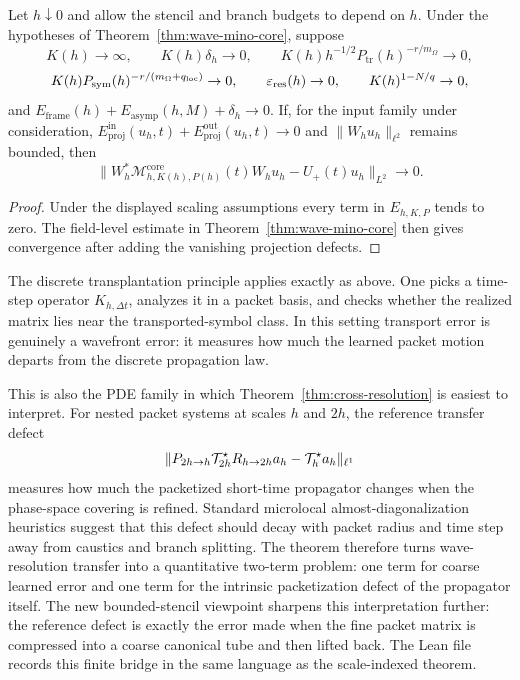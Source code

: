\begin{corollary}
\label{cor:rate-balancing}
Let $h\downarrow0$ and allow the stencil and branch budgets to depend on $h$.  Under the hypotheses of Theorem~\ref{thm:wave-mino-core}, suppose
\[
K(h)\to\infty,\qquad
K(h)\delta_h\to0,\qquad
K(h)h^{-1/2}P_{\mathrm{tr}}(h)^{-r/m_\Omega}\to0,
\]
\[
K(h)P_{\mathrm{sym}}(h)^{-r/(m_\Omega+q_{\mathrm{loc}})}\to0,\qquad
\varepsilon_{\mathrm{res}}(h)\to0,\qquad
K(h)^{1-N/q}\to0,
\]
and $E_{\mathrm{frame}}(h)+E_{\mathrm{asymp}}(h,M)+\delta_h\to0$.  If, for the input family under consideration, $E_{\mathrm{proj}}^{\mathrm{in}}(u_h,t)+E_{\mathrm{proj}}^{\mathrm{out}}(u_h,t)\to0$ and $\|W_hu_h\|_{\ell^2}$ remains bounded, then
\[
\|W_h^\ast\mathcal M_{h,K(h),P(h)}^{\mathrm{core}}(t)W_hu_h-U_+(t)u_h\|_{L^2}
\to0.
\]
\end{corollary}

\begin{proof}
Under the displayed scaling assumptions every term in $E_{h,K,P}$ tends to zero.  The field-level estimate in Theorem~\ref{thm:wave-mino-core} then gives convergence after adding the vanishing projection defects.
\end{proof}

The discrete transplantation principle applies exactly as above. One picks a time-step operator $K_{h,\Delta t}$, analyzes it in a packet basis, and checks whether the realized matrix lies near the transported-symbol class. In this setting transport error is genuinely a wavefront error: it measures how much the learned packet motion departs from the discrete propagation law.

This is also the PDE family in which Theorem~\ref{thm:cross-resolution} is easiest to interpret. For nested packet systems at scales $h$ and $2h$, the reference transfer defect
\[
\|P_{2h\to h}\mathcal T^\star_{2h}R_{h\to 2h}a_h - \mathcal T^\star_h a_h\|_{\ell^1}
\]
measures how much the packetized short-time propagator changes when the phase-space covering is refined. Standard microlocal almost-diagonalization heuristics suggest that this defect should decay with packet radius and time step away from caustics and branch splitting. The theorem therefore turns wave-resolution transfer into a quantitative two-term problem: one term for coarse learned error and one term for the intrinsic packetization defect of the propagator itself.
The new bounded-stencil viewpoint sharpens this interpretation further: the reference defect is exactly the error made when the fine packet matrix is compressed into a coarse canonical tube and then lifted back. The Lean file  records this finite bridge in the same language as the scale-indexed theorem.

